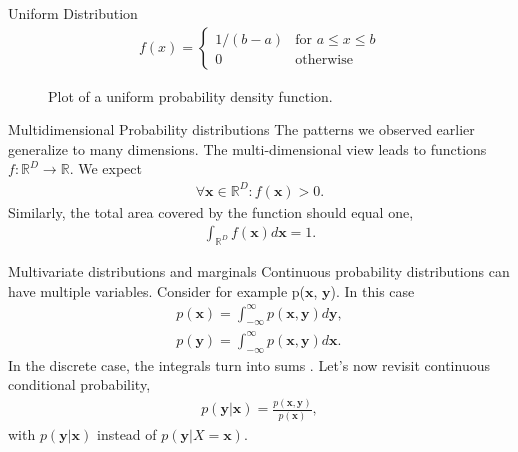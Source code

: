 \documentclass{beamer}
\begin{document}
    \begin{frame}{Uniform Distribution}
      \begin{align}
        f(x) = \begin{cases}
        1/(b-a)   &    \text{for } a \leq x \leq b \\
        0         &    \text{otherwise}  
        \end{cases}
      \end{align}
      \begin{figure}
      
      \caption{Plot of a uniform probability density function.}
      \end{figure}
    \end{frame}

    \begin{frame}{Multidimensional Probability distributions \cite{deisenroth2020mathematics}}
      The patterns we observed earlier generalize to many dimensions.
      The multi-dimensional view leads to functions $f: \mathbb{R}^D \rightarrow \mathbb{R}$.
      We expect
      \begin{align}
        \forall \mathbf{x} \in \mathbb{R}^D : f(\mathbf{x}) > 0.
      \end{align}
      Similarly, the total area covered by the function should equal one,
      \begin{align}
        \int_{\mathbb{R}^D} f(\mathbf{x}) d\mathbf{x} = 1.
      \end{align}
    
    \end{frame}

    \begin{frame}{Multivariate distributions and marginals}
      Continuous probability distributions can have multiple variables.
      Consider for example p($\mathbf{x}$, $\mathbf{y}$).
      In this case 
      \begin{align}
        p(\mathbf{x}) = \int_{-\infty}^{\infty} p(\mathbf{x}, \mathbf{y}) d\mathbf{y}, \\
        p(\mathbf{y}) = \int_{-\infty}^{\infty} p(\mathbf{x}, \mathbf{y}) d\mathbf{x}.
      \end{align}
      In the discrete case, the integrals turn into sums \cite{deisenroth2020mathematics}.
      Let's now revisit continuous conditional probability,
      \begin{align}
        p(\mathbf{y}|\mathbf{x}) = \frac{p(\mathbf{x}, \mathbf{y})}{p(\mathbf{x})},
      \end{align}
      with $p(\mathbf{y}|\mathbf{x})$ instead of $p(\mathbf{y}|X = \mathbf{x})$.
    \end{frame}
\end{document}
